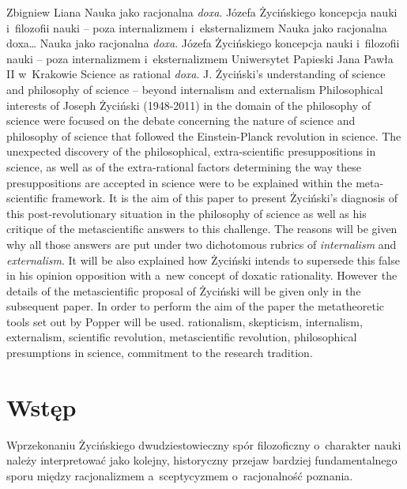 \begin{artplenv}{Zbigniew Liana}
	{Nauka jako racjonalna \textit{doxa}. Józefa Życińskiego koncepcja nauki i~filozofii nauki -- poza internalizmem i~eksternalizmem}
	{Nauka jako racjonalna doxa\ldots}
	{Nauka jako racjonalna \textit{doxa}. Józefa Życińskiego koncepcja nauki i~filozofii nauki -- poza internalizmem i~eksternalizmem}
	{Uniwersytet Papieski Jana Pawła II w~Krakowie}
	{Science as rational \textit{doxa}. J. Życiński's understanding of science and philosophy of science -- beyond internalism and externalism}
	{Philosophical interests of Joseph Życiński (1948-2011) in the domain of the philosophy of science were focused on the
		debate concerning the nature of science and philosophy of science that followed the Einstein-Planck revolution in
		science. The unexpected discovery of the philosophical, extra-scientific  presuppositions in science, as well as of the
		extra-rational factors determining the way these presuppositions are accepted in science were to be explained within
		the meta-scientific framework. It is the aim of this paper to present Życiński's diagnosis of this post-revolutionary
		situation in the philosophy of science as well as his critique of the metascientific answers to this challenge. The
		reasons will be given why all those answers are put under two dichotomous rubrics of \textit{internalism} and
		\textit{externalism}. It will be also explained how Życiński intends to supersede this false in his opinion opposition
		with a~new concept of doxatic rationality. However the details of the metascientific proposal of Życiński will be given
		only in the subsequent paper. In order to perform the aim of the paper the metatheoretic tools set out by Popper
		\parencite*{popper_beiden_1979}
		will be used.}
	{rationalism, skepticism, internalism, externalism, scientific revolution, metascientific revolution, philosophical
		presumptions in science, commitment to the research tradition.}


\section*{Wstęp}

\lettrine[loversize=0.13,lines=2,lraise=-0.05,nindent=0em,findent=0.2pt]%
{W}{}przekonaniu Życińskiego dwudziestowieczny spór filozoficzny o~charakter nauki należy interpretować jako kolejny,
historyczny przejaw bardziej fundamentalnego sporu między racjonalizmem a~sceptycyzmem o~racjonalność poznania.


\end{artplenv}
